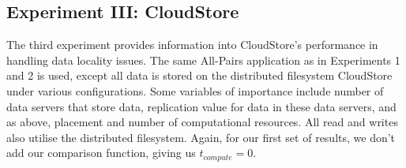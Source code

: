 \documentclass{rspublic}
\begin{document}
\subsection{Experiment III: CloudStore} 
The third experiment provides information into CloudStore's performance
in handling data locality issues. The same All-Pairs application as in
Experiments 1 and 2 is used, except all data is stored on the
distributed filesystem CloudStore under various configurations. Some
variables of importance include number of data servers that store data,
replication value for data in these data servers, and as above,
placement and number of computational resources.  All read and writes
also utilise the distributed filesystem. Again, for our first set of
results, we don't add our comparison function, giving us
$t_{compute}=0$.  
\begin{figure}
\begin{center}
\end{center}
\end{figure}
\end{document}
